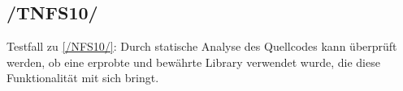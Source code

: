 \subsection*{/TNFS10/}
\label{/TNFS10/} Testfall zu \ref{/NFS10/}: Durch \gls{statische Analyse} des \Gls{Quellcode}s kann überprüft werden, ob eine erprobte und bewährte \Gls{Library} verwendet wurde,
die diese Funktionalität mit sich bringt.